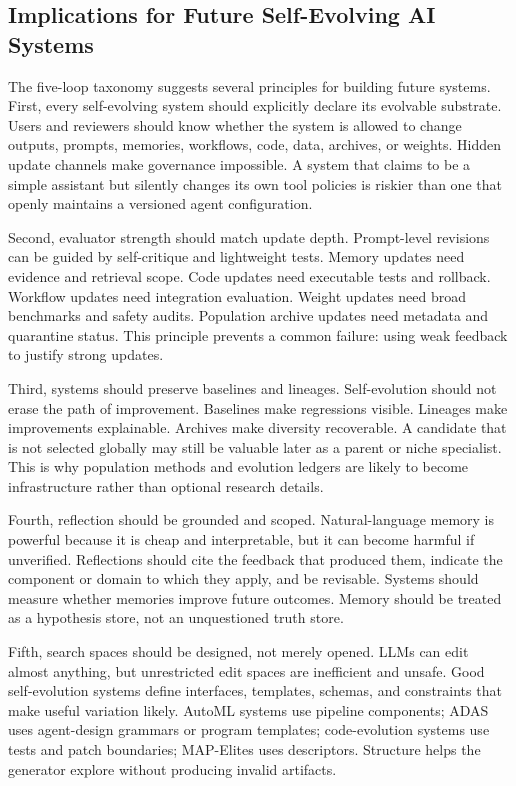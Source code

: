 \subsection{Implications for Future Self-Evolving AI Systems}
\label{subsec:taxonomy-implications}

The five-loop taxonomy suggests several principles for building future systems.  First, every self-evolving system should explicitly declare its evolvable substrate.  Users and reviewers should know whether the system is allowed to change outputs, prompts, memories, workflows, code, data, archives, or weights.  Hidden update channels make governance impossible.  A system that claims to be a simple assistant but silently changes its own tool policies is riskier than one that openly maintains a versioned agent configuration.

Second, evaluator strength should match update depth.  Prompt-level revisions can be guided by self-critique and lightweight tests.  Memory updates need evidence and retrieval scope.  Code updates need executable tests and rollback.  Workflow updates need integration evaluation.  Weight updates need broad benchmarks and safety audits.  Population archive updates need metadata and quarantine status.  This principle prevents a common failure: using weak feedback to justify strong updates.

Third, systems should preserve baselines and lineages.  Self-evolution should not erase the path of improvement.  Baselines make regressions visible.  Lineages make improvements explainable.  Archives make diversity recoverable.  A candidate that is not selected globally may still be valuable later as a parent or niche specialist.  This is why population methods and evolution ledgers are likely to become infrastructure rather than optional research details.

Fourth, reflection should be grounded and scoped.  Natural-language memory is powerful because it is cheap and interpretable, but it can become harmful if unverified.  Reflections should cite the feedback that produced them, indicate the component or domain to which they apply, and be revisable.  Systems should measure whether memories improve future outcomes.  Memory should be treated as a hypothesis store, not an unquestioned truth store.

Fifth, search spaces should be designed, not merely opened.  LLMs can edit almost anything, but unrestricted edit spaces are inefficient and unsafe.  Good self-evolution systems define interfaces, templates, schemas, and constraints that make useful variation likely.  AutoML systems use pipeline components; ADAS uses agent-design grammars or program templates; code-evolution systems use tests and patch boundaries; MAP-Elites uses descriptors.  Structure helps the generator explore without producing invalid artifacts.

